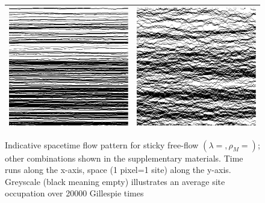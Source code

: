 \begin{figure}[h!]
\caption{\label{fig:flowPatterns} Indicative spacetime flow pattern for sticky free-flow $(\lambda = , \rho_M = )$; other combinations shown in the supplementary materials.
Time runs along the x-axis, space (1 pixel=1 site) along the y-axis. Greyscale (black meaning empty) illustrates an average site occupation over 20000 Gillespie times}
\begin{center}
 \begin{tabular}{c | c}
    \includegraphics[width=0.49\linewidth]{../tex-src/images/newFlowImps/shortTime}  &\includegraphics[width=0.49\linewidth]{../tex-src/images/newFlowImps/midShortTime} \\
    \hline

\end{tabular}
\end{center}
\end{figure}
